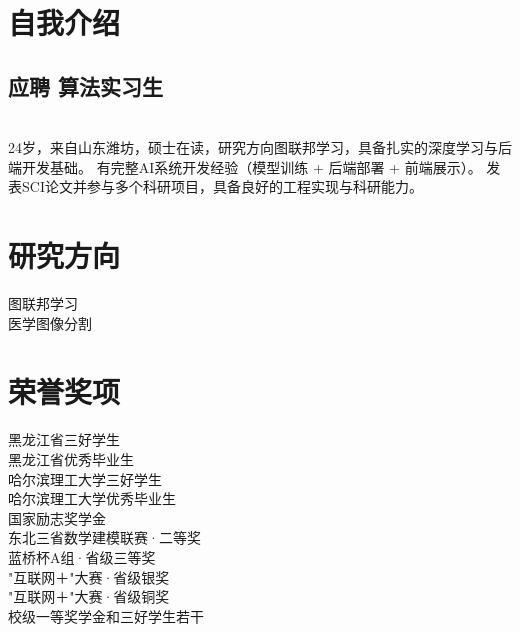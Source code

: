 \documentclass[]{deedy-resume-openfont}
\begin{document}
\begin{minipage}[t]{0.3\textwidth}
\section{自我介绍}
\subsection{应聘 \quad 算法实习生}
\quad \\
24岁，来自山东潍坊，硕士在读，研究方向图联邦学习，具备扎实的深度学习与后端开发基础。
有完整AI系统开发经验（模型训练 + 后端部署 + 前端展示）。
发表SCI论文并参与多个科研项目，具备良好的工程实现与科研能力。
\sectionsep

\section{研究方向}
\textbullet{} 图联邦学习 \\
\textbullet{} 医学图像分割



\section{荣誉奖项}
\textbullet{} 黑龙江省三好学生\\
\textbullet{} 黑龙江省优秀毕业生\\
\textbullet{} 哈尔滨理工大学三好学生\\
\textbullet{} 哈尔滨理工大学优秀毕业生\\
\textbullet{} 国家励志奖学金\\
\textbullet{} 东北三省数学建模联赛·二等奖 \\
\textbullet{} 蓝桥杯A组·省级三等奖 \\
\textbullet{} "互联网＋"大赛·省级银奖 \\
\textbullet{} "互联网＋"大赛·省级铜奖 \\
\textbullet{} 校级一等奖学金和三好学生若干\\


\end{minipage}
\end{document}
